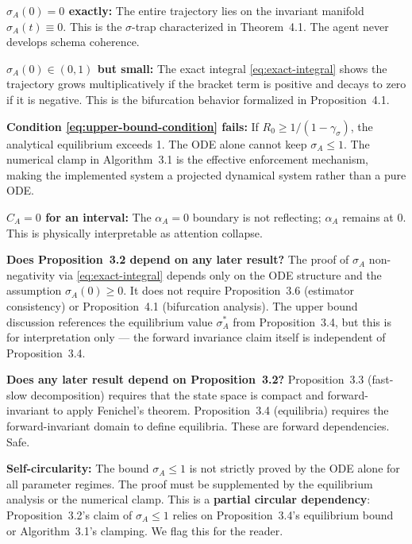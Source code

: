 \begin{boundary-case}
\textbf{$\sigma_A(0) = 0$ exactly:} The entire trajectory lies on the
invariant manifold $\sigma_A(t) \equiv 0$. This is the $\sigma$-trap
characterized in Theorem~4.1. The agent never develops schema coherence.

\textbf{$\sigma_A(0) \in (0, 1)$ but small:} The exact integral
\eqref{eq:exact-integral} shows the trajectory grows multiplicatively
if the bracket term is positive and decays to zero if it is negative.
This is the bifurcation behavior formalized in Proposition~4.1.

\textbf{Condition \eqref{eq:upper-bound-condition} fails:} If
$R_0 \geq 1/(1 - \gamma_\sigma)$, the analytical equilibrium exceeds 1.
The ODE alone cannot keep $\sigma_A \leq 1$. The numerical clamp in
Algorithm~3.1 is the effective enforcement mechanism, making the
implemented system a projected dynamical system rather than a pure ODE.

\textbf{$C_A = 0$ for an interval:} The $\alpha_A = 0$ boundary is not
reflecting; $\alpha_A$ remains at 0. This is physically interpretable as
attention collapse.
\end{boundary-case}

\begin{circularity-check}
\textbf{Does Proposition~3.2 depend on any later result?}
The proof of $\sigma_A$ non-negativity via \eqref{eq:exact-integral}
depends only on the ODE structure and the assumption $\sigma_A(0) \geq 0$.
It does not require Proposition~3.6 (estimator consistency) or
Proposition~4.1 (bifurcation analysis). The upper bound discussion
references the equilibrium value $\sigma_A^*$ from Proposition~3.4,
but this is for interpretation only --- the forward invariance claim
itself is independent of Proposition~3.4.

\textbf{Does any later result depend on Proposition~3.2?}
Proposition~3.3 (fast-slow decomposition) requires that the state
space is compact and forward-invariant to apply Fenichel's theorem.
Proposition~3.4 (equilibria) requires the forward-invariant domain to
define equilibria. These are forward dependencies. Safe.

\textbf{Self-circularity:} The bound $\sigma_A \leq 1$ is not strictly
proved by the ODE alone for all parameter regimes. The proof must
be supplemented by the equilibrium analysis or the numerical clamp.
This is a \textbf{partial circular dependency}: Proposition~3.2's
claim of $\sigma_A \leq 1$ relies on Proposition~3.4's equilibrium
bound or Algorithm~3.1's clamping. We flag this for the reader.
\end{circularity-check}
